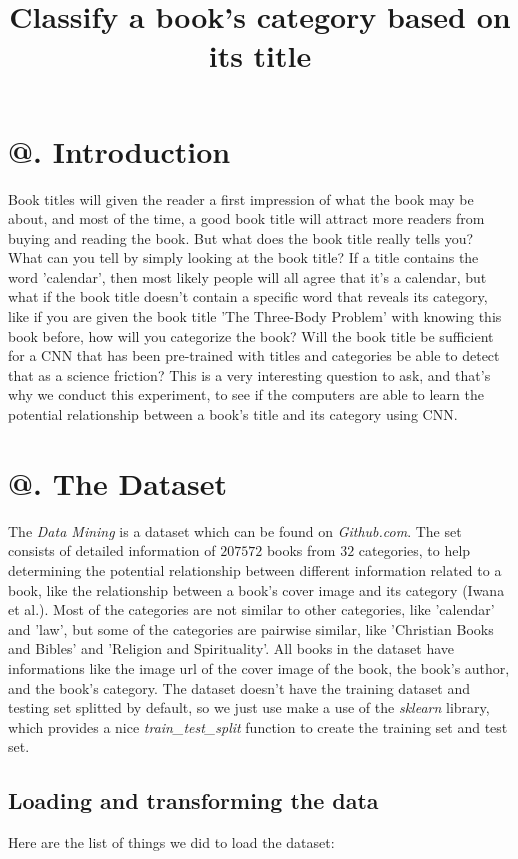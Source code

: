 \documentclass[jou,apacite, 10px]{apa6}
\title{Classify a book's category based on its title}
\makeatletter
\newcommand*{\rom}[1]{\expandafter\@slowromancap\romannumeral #1@}
\makeatother
\begin{document}
\maketitle    
                        
\section{\rom{1}. Introduction}
Book titles will given the reader a first impression of what the book may be about, and most of the time, a good book title will attract more readers from buying and reading the book. But what does the book title really tells you? What can you tell by simply looking at the book title? If a title contains the word 'calendar', then most likely people will all agree that it's a calendar, but what if the book title doesn't contain a specific word that reveals its category, like if you are given the book title 'The Three-Body Problem' with knowing this book before, how will you categorize the book? Will the book title be sufficient for a CNN that has been pre-trained with titles and categories be able to detect that as a science friction? This is a very interesting question to ask, and that's why we conduct this experiment, to see if the computers are able to learn the potential relationship between a book's title and its category using CNN.

\section{\rom{2}. The Dataset}
The \textit{Data Mining} is a dataset which can be found on \textit{Github.com}. The set consists of detailed information of $207572$  books from $32$ categories, to help determining the potential relationship between different information related to a book, like the relationship between a book's cover image and its category (Iwana et al.). Most of the categories are not similar to other categories, like 'calendar' and 'law', but some of the categories are pairwise similar, like 'Christian Books and Bibles' and 'Religion and Spirituality'. All books in the dataset have informations like the image url of the cover image of the book, the book's author, and the book's category. The dataset doesn't have the training dataset and testing set splitted by default, so we just use make a use of the \textit{sklearn} library, which provides a nice \textit{train\_test\_split} function to create the training set and test set.

\subsection{Loading and transforming the data}
Here are the list of things we did to load the dataset:
\end{document}

